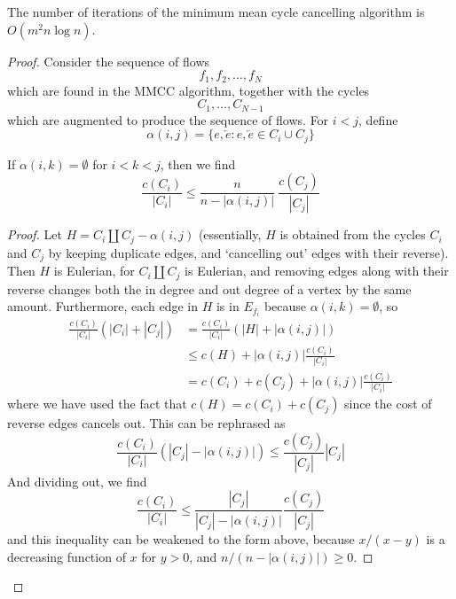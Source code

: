 \begin{theorem}
    The number of iterations of the minimum mean cycle cancelling algorithm is $O(m^2 n \log n)$.
\end{theorem}
\begin{proof}
    Consider the sequence of flows
    \[ f_1, f_2, \dots, f_N \]
    which are found in the MMCC algorithm, together with the cycles
    \[ C_1, \dots, C_{N-1} \]
    which are augmented to produce the sequence of flows. For $i < j$, define
    \[ \alpha(i,j) = \{ e, \overleftarrow{e} : e, \overleftarrow{e} \in C_i \cup C_j \} \]

    \begin{lemma}
        If $\alpha(i,k) = \emptyset$ for $i < k < j$, then we find
        \[ \frac{c(C_i)}{|C_i|} \leq \frac{n}{n-|\alpha(i,j)|}\ \frac{c(C_j)}{|C_j|} \]
    \end{lemma}
    \begin{proof}
    Let $H = C_i \coprod C_j - \alpha(i,j)$ (essentially, $H$ is obtained from the cycles $C_i$ and $C_j$ by keeping duplicate edges, and `cancelling out' edges with their reverse). Then $H$ is Eulerian, for $C_i \coprod C_j$ is Eulerian, and removing edges along with their reverse changes both the in degree and out degree of a vertex by the same amount. Furthermore, each edge in $H$ is in $E_{f_i}$ because $\alpha(i,k) = \emptyset$, so
    \begin{align*}
        \frac{c(C_i)}{|C_i|} (|C_i| + |C_j|) &= \frac{c(C_i)}{|C_i|} (|H| + |\alpha(i,j)|)\\
        &\leq c(H) + |\alpha(i,j)| \frac{c(C_i)}{|C_i|}\\
        &= c(C_i) + c(C_j) + |\alpha(i,j)| \frac{c(C_i)}{|C_i|}
    \end{align*}
    where we have used the fact that $c(H) = c(C_i) + c(C_j)$ since the cost of reverse edges cancels out. This can be rephrased as
    \[ \frac{c(C_i)}{|C_i|} \left( |C_j| - |\alpha(i,j)| \right) \leq \frac{c(C_j)}{|C_j|} |C_j| \]
    And dividing out, we find
    \[ \frac{c(C_i)}{|C_i|} \leq \frac{|C_j|}{|C_j| - |\alpha(i,j)|} \frac{c(C_j)}{|C_j|} \]
    and this inequality can be weakened to the form above, because $x/(x-y)$ is a decreasing function of $x$ for $y > 0$, and $n/(n-|\alpha(i,j)|) \geq 0$.
    \end{proof}


\end{proof}
